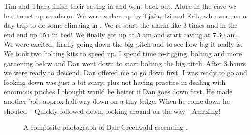 Tim and Thara finish their caving in  and went
back out. Alone in the cave we had to set up an alarm. We were woken up
by Tjaša, Izi and Erik, who were on a day trip to do some climbing in
. We re-start the alarm like 3 times and in the end end up
15h in bed! We finally got up at 5 am and start caving at 7.30 am. We
were excited, finally going down the big pitch and to see how big it
really is. We took two bolting kits to speed up. I spend time re-rigging,
bolting and more gardening below  and Dan went down to
start bolting the big pitch. After 3 hours we were ready to descend. Dan
offered me to go down first. I was ready to go and looking down was just
a bit scary, plus not having practice in dealing with enormous pitches I
thought would be better if Dan goes down first. He made another bolt
approx half way down on a tiny ledge. When he come down he shouted --  Quickly followed down, looking around on the
way - Amazing!

\begin{figure}[t!]
\checkoddpage \ifoddpage \forcerectofloat \else \forceversofloat \fi
{}
\caption{A composite photograph of Dan Greenwald ascending \protect{}. }
\label{happy monday pitch}
\end{figure}


